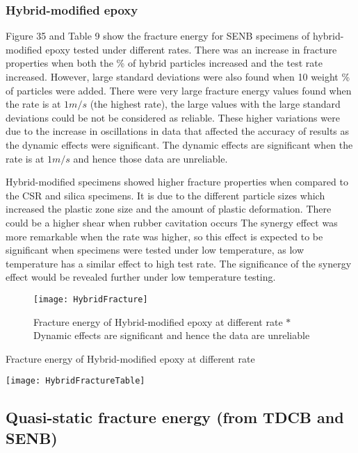 \documentclass[numbers=noendperiod,chapterprefix=on]{icldt} %
\begin{document}
\subsubsection{Hybrid-modified epoxy}
Figure 35 and Table 9 show the fracture energy for SENB specimens of hybrid-modified epoxy tested under different rates. There was an increase in fracture properties when both the \% of hybrid particles increased and the test rate increased. However, large standard deviations were also found when 10 weight \% of particles were added. There were very large fracture energy values found when the rate is at $1 m/s$ (the highest rate), the large values with the large standard deviations could be not be considered as reliable. These higher variations were due to the increase in oscillations in data that affected the accuracy of results as the dynamic effects were significant. The dynamic effects are significant when the rate is at $1 m/s$ and hence those data are unreliable.

Hybrid-modified specimens showed higher fracture properties when compared to the CSR and silica specimens. It is due to the different particle sizes which increased the plastic zone size and the amount of plastic deformation. There could be a higher shear when rubber cavitation occurs 
The synergy effect was more remarkable when the rate was higher, so this effect is expected to be significant when specimens were tested under low temperature, as low temperature has a similar effect to high test rate. The significance of the synergy effect would be revealed further under low temperature testing.

\begin{figure}[!htpb]
\centering
\texttt{[image: HybridFracture]}
\caption{Fracture energy of Hybrid-modified epoxy at different rate \newline $\ast$ Dynamic effects are significant and hence the data are unreliable} %
\end{figure}
\FloatBarrier

\begin{table}[!htpb]
\centering
\caption{Fracture energy of Hybrid-modified epoxy at different rate} %
\texttt{[image: HybridFractureTable]}
\end{table}
\FloatBarrier

\subsection{Quasi-static fracture energy (from TDCB and SENB)}
\end{document}
